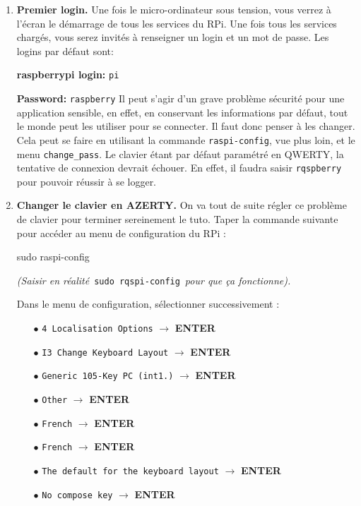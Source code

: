 \documentclass[a4paper, 10pt]{article}
\begin{document}
\begin{enumerate}
	\item\textbf{Premier login.} Une fois le micro-ordinateur sous tension, 
	vous verrez à l'écran le démarrage de tous les services du RPi. 
	Une fois tous les services chargés, vous serez invités à renseigner un 
	login et un mot de passe. Les logins par défaut sont:
	
	\textbf{raspberrypi login:} \texttt{pi}

	\textbf{Password:} \texttt{raspberry}
	Il peut s'agir d'un grave problème sécurité pour une application sensible, 
	en effet, en conservant les informations par défaut, tout le monde peut les 
	utiliser pour se connecter. Il faut donc penser à les changer. Cela peut se 
	faire en utilisant la commande \texttt{raspi-config}, vue plus loin, et le 
	menu \texttt{change\_pass}.
	Le clavier étant par défaut paramétré en QWERTY, la tentative de connexion 
	devrait échouer. En effet, il faudra saisir \texttt{rqspberry} pour pouvoir 
	réussir à se logger.
	
	\item\textbf{Changer le clavier en AZERTY.} On va tout de suite régler 
	ce problème de clavier pour terminer sereinement le tuto. 
	Taper la commande suivante pour accéder au menu de configuration du RPi :
	
\begin{commandshell}
sudo raspi-config
\end{commandshell}
	
	\textit{(Saisir en réalité}\
	\texttt{sudo rqspi-config}\
	\textit{pour que ça fonctionne).}
	
	Dans le menu de configuration, sélectionner successivement :

	\begin{itemize}
		\item[$\bullet$] \texttt{4 Localisation Options} 
						 $\rightarrow$ \textbf{ENTER}
		\item[$\bullet$] \texttt{I3 Change Keyboard Layout}
						 $\rightarrow$ \textbf{ENTER}
		\item[$\bullet$] \texttt{Generic 105-Key PC (int1.)}
						 $\rightarrow$ \textbf{ENTER}
		\item[$\bullet$] \texttt{Other}
						 $\rightarrow$ \textbf{ENTER}
		\item[$\bullet$] \texttt{French}
						 $\rightarrow$ \textbf{ENTER}	
		\item[$\bullet$] \texttt{French}
						 $\rightarrow$ \textbf{ENTER}	
		\item[$\bullet$] \texttt{The default for the keyboard layout}
						 $\rightarrow$ \textbf{ENTER}	
		\item[$\bullet$] \texttt{No compose key}
						 $\rightarrow$ \textbf{ENTER}			 		
	\end{itemize}
	

\end{enumerate}
\end{document}
